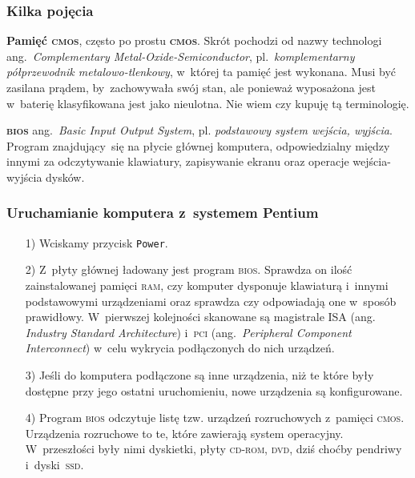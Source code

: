 \documentclass[10pt,t]{beamer}
\begin{document}
\begin{frame}
  \frametitle{Kilka pojęcia}


  \textbf{Pamięć \textsc{cmos}}, często po prostu \textbf{\textsc{cmos}}.
  Skrót pochodzi od nazwy technologi ang.~\textit{Complementary
    Metal-Oxide-Semiconductor}, pl.~\textit{komplementarny półprzewodnik
    metalowo-tlenkowy}, w~której ta pamięć jest wykonana. Musi być zasilana
  prądem, by~zachowywała swój stan, ale ponieważ wyposażona jest w~baterię
  klasyfikowana jest jako nieulotna. Nie wiem czy kupuję tą terminologię.

  \textbf{\textsc{bios}} ang.~\textit{Basic Input Output System}, pl.
  \textit{podstawowy system wejścia, wyjścia}. Program znajdujący~się
  na płycie głównej komputera, odpowiedzialny między innymi za odczytywanie
  klawiatury, zapisywanie ekranu oraz operacje wejścia-wyjścia dysków.

\end{frame}





\begin{frame}
  \frametitle{Uruchamianie komputera z~systemem Pentium}


  \begin{itemize}

  \item[1)] Wciskamy przycisk \texttt{Power}.

  \item[2)] Z~płyty głównej ładowany jest program \textsc{bios}. Sprawdza on
    ilość zainstalowanej pamięci \textsc{ram}, czy komputer dysponuje
    klawiaturą i~innymi podstawowymi urządzeniami oraz sprawdza czy
    odpowiadają one w~sposób prawidłowy. W~pierwszej kolejności skanowane
    są magistrale \textsc{ISA} (ang. \textit{Industry Standard
      Architecture}) i~\textsc{pci} (ang.~\textit{Peripheral Component
      Interconnect}) w~celu wykrycia podłączonych do nich urządzeń.

  \item[3)] Jeśli do komputera podłączone są inne urządzenia, niż te które
    były dostępne przy jego ostatni uruchomieniu, nowe urządzenia są
    konfigurowane.

  \item[4)] Program \textsc{bios} odczytuje listę tzw. urządzeń rozruchowych
    z~pamięci \textsc{cmos}. Urządzenia rozruchowe to te, które zawierają
    system operacyjny. W~przeszłości były nimi dyskietki, płyty
    \textsc{cd}-\textsc{rom}, \textsc{dvd}, dziś choćby pendriwy
    i~dyski~\textsc{ssd}.

  \end{itemize}

\end{frame}
\end{document}
